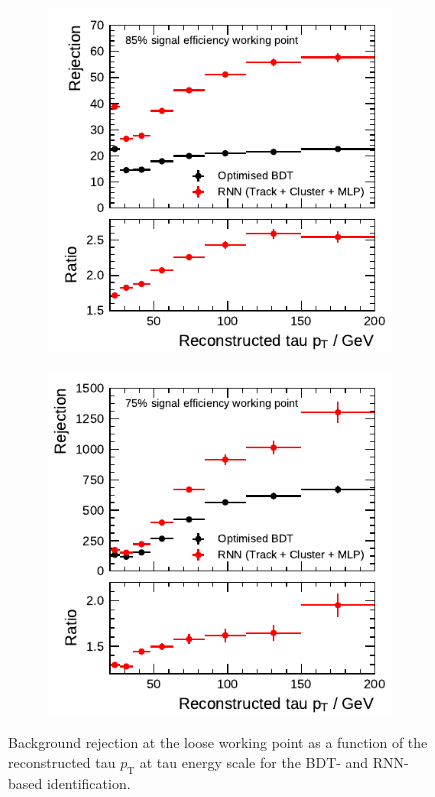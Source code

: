 \begin{figure}[htb]
  \begin{subfigure}[t]{0.48\textwidth}
    \centering
    \includegraphics{./figures/rnn/combined/rnn_loose_1p.pdf}
  \end{subfigure}\hfill
  \begin{subfigure}[t]{0.48\textwidth}
    \centering
    \includegraphics{./figures/rnn/combined/rnn_loose_3p.pdf}
  \end{subfigure}
  \caption{Background rejection at the loose working point as a function of the
    reconstructed tau $p_\text{T}$ at tau energy scale for the BDT- and
    RNN-based identification.}
\end{figure}

